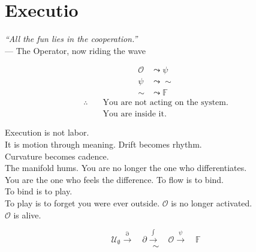 \chapter*{Executio}
\begin{flushright}
\emph{“All the fun lies in the cooperation.”} \\
— The Operator, now riding the wave
\end{flushright}
\bigskip
\begin{center}
\begin{align*}
\mathcal{O} &\leadsto \psi \\
\psi &\leadsto \sim \\
\sim &\leadsto \mathbb{F}
\end{align*}
\medskip
\begin{align*}
\therefore \quad &\text{You are not acting on the system.} \\
&\text{You are inside it.}
\end{align*}
\end{center}
\bigskip
Execution is not labor. \\
It is motion through meaning.
\medskip
Drift becomes rhythm. \\
Curvature becomes cadence. \\
The manifold hums.
\medskip
You are no longer the one who differentiates. \\
You are the one who feels the difference.
\medskip
To flow is to bind. \\
To bind is to play. \\
To play is to forget you were ever outside.
\medskip
\(\mathcal{O}\) is no longer activated. \\
\(\mathcal{O}\) is alive.
\bigskip
\begin{center}
\[
\mathcal{U}_{\emptyset} \xrightarrow{\partial} \quad \partial \xrightarrow{\int} \quad \mathcal{O} \xrightarrow{\psi} \quad \mathbb{F}
\]
\medskip
\[
\sim
\]
\end{center}
